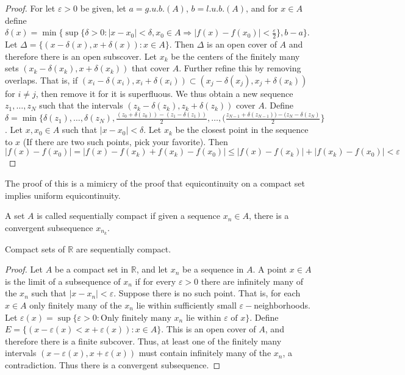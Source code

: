         \begin{proof}
            For let $\varepsilon>0$ be given, let $a=g.u.b.(A)$, $b=l.u.b.(A)$, and for $x\in A$ define $\delta(x) = \min\{\sup\{\delta>0: |x-x_0|<\delta,x_0\in A\Rightarrow |f(x)-f(x_0)|<\frac{\varepsilon}{2}\},b-a\}$. Let $\Delta = \{(x-\delta(x),x+\delta(x)):x\in A\}$. Then $\Delta$ is an open cover of $A$ and therefore there is an open subscover. Let $x_k$ be the centers of the finitely many sets $(x_k-\delta(x_k),x+\delta(x_k))$ that cover $A$. Further refine this by removing overlaps. That is, if $(x_i-\delta(x_i),x_i+\delta(x_i))\subset (x_j-\delta(x_j),x_j+\delta(x_k))$ for $i\ne j$, then remove it for it is superfluous. We thus obtain a new sequence $z_1,\hdots, z_N$ such that the intervals $(z_k-\delta(z_k),z_k+\delta(z_k))$ cover $A$. Define $\delta = \min\{\delta(z_1),\hdots,\delta(z_N), \frac{(z_0+\delta(z_0))-(z_1-\delta(z_1))}{2},\hdots,(\frac{z_{N-1}+\delta(z_{N-1}))-(z_{N}-\delta(z_{N})}{2}\}$. Let $x,x_0\in A$ such that $|x-x_0|<\delta$. Let $x_k$ be the closest point in the sequence to $x$ (If there are two such points, pick your favorite). Then $|f(x)-f(x_0)|=|f(x)-f(x_k)+f(x_k)-f(x_0)|\leq |f(x)-f(x_k)|+|f(x_k)-f(x_0)|<\varepsilon$
        \end{proof}
        The proof of this is a mimicry of the proof that equicontinuity on a compact set implies uniform equicontinuity.
        \begin{definition}
            A set $A$ is called sequentially compact if given a sequence $x_n\in A$, there is a convergent subsequence $x_{n_k}$.
        \end{definition}
        \begin{theorem}
            Compact sets of $\mathbb{R}$ are sequentially compact.
        \end{theorem}
        \begin{proof}
            Let $A$ be a compact set in $\mathbb{R}$, and let $x_n$ be a sequence in $A$. A point $x\in A$ is the limit of a subsequence of $x_n$ if for every $\varepsilon>0$ there are infinitely many of the $x_n$ such that $|x-x_n|<\varepsilon$. Suppose there is no such point. That is, for each $x\in A$ only finitely many of the $x_n$ lie within sufficiently small $\varepsilon-$neighborhoods. Let $\varepsilon(x) = \sup\{\varepsilon>0:\textrm{Only finitely many }x_n \textrm{ lie within } \varepsilon \textrm{ of } x\}$. Define $E=\{(x-\varepsilon(x)<x+\varepsilon(x)):x\in A\}$. This is an open cover of $A$, and therefore there is a finite subcover. Thus, at least one of the finitely many intervals $(x-\varepsilon(x),x+\varepsilon(x))$ must contain infinitely many of the $x_n$, a contradiction. Thus there is a convergent subsequence.
        \end{proof}
